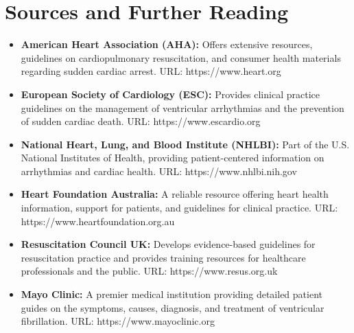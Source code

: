 \section*{Sources and Further Reading}
\begin{itemize}
    \item \textbf{American Heart Association (AHA):} Offers extensive resources, guidelines on cardiopulmonary resuscitation, and consumer health materials regarding sudden cardiac arrest. URL: https://www.heart.org
    \item \textbf{European Society of Cardiology (ESC):} Provides clinical practice guidelines on the management of ventricular arrhythmias and the prevention of sudden cardiac death. URL: https://www.escardio.org
    \item \textbf{National Heart, Lung, and Blood Institute (NHLBI):} Part of the U.S. National Institutes of Health, providing patient-centered information on arrhythmias and cardiac health. URL: https://www.nhlbi.nih.gov
    \item \textbf{Heart Foundation Australia:} A reliable resource offering heart health information, support for patients, and guidelines for clinical practice. URL: https://www.heartfoundation.org.au
    \item \textbf{Resuscitation Council UK:} Develops evidence-based guidelines for resuscitation practice and provides training resources for healthcare professionals and the public. URL: https://www.resus.org.uk
    \item \textbf{Mayo Clinic:} A premier medical institution providing detailed patient guides on the symptoms, causes, diagnosis, and treatment of ventricular fibrillation. URL: https://www.mayoclinic.org
\end{itemize}